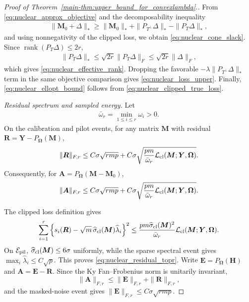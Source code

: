 \documentclass[numsec,webpdf,modern,large,namedate]{oup-authoring-template}
\theoremstyle{plain}
\theoremstyle{remark}
\newcommand{\M}{\bm{M}}
\newcommand{\bH}{\bm{H}}
\newcommand{\Y}{\bm{Y}}
\newcommand{\bOmega}{\bm{\Omega}}
\newif\ifmarkchanges
\newenvironment{revision}{\begingroup\ifmarkchanges\color{red}\fi}{\endgroup}
\begin{document}
\begin{revision}
\begin{proof}[Proof of Theorem~\ref{main-thm:upper_bound_for_convexlambda}.]
From \eqref{eq:nuclear_approx_objective} and the decomposability inequality
\begin{align*}
 \|\M_0+\Delta\|_*
 \ge
 \|\M_0\|_*
 +
 \|P_{T^\perp}\Delta\|_*
 -
 \|P_T\Delta\|_*,
\end{align*}
and using nonnegativity of the clipped loss, we obtain
\eqref{eq:nuclear_cone_slack}.  Since
$\operatorname{rank}(P_T\Delta)\le2r$,
\begin{align*}
 \|P_T\Delta\|_*
 \le
 \sqrt{2r}\|P_T\Delta\|_F
 \le
 \sqrt{2r}\|\Delta\|_F,
\end{align*}
which gives \eqref{eq:nuclear_effective_rank}.  Dropping the favorable
$-\lambda\|P_{T^\perp}\Delta\|_*$ term in the same objective
comparison gives \eqref{eq:nuclear_loss_upper}.  Finally,
\eqref{eq:nuclear_ellopt_bound} follows from
\eqref{eq:nuclear_clipped_true_loss}.

\textit{Residual spectrum and sampled energy.} Let
\begin{align}
\label{eq:nuclear_omega_r}
 \bar\omega_r
 =
 \min_{1\le i\le r}\omega_i
 >0.
\end{align}
On the calibration and pilot events, for any matrix $\M$ with residual
$\bm R=\Y-P_{\bOmega}(\M)$,
\begin{align}
 \|\bm R\|_{F,r}
 \le
 C\sigma\sqrt{rmp}
 +
 C\sigma
 \sqrt{
 \frac{pm}{\bar\omega_r}
 \mathcal L_{\rm cl}(\M;\Y,\bOmega)
 }.
 \label{eq:nuclear_residual_topr}
\end{align}
Consequently, for
$\bm A=P_{\bOmega}(\M-\M_0)$,
\begin{align}
 \|\bm A\|_{F,r}
 \le
 C\sigma\sqrt{rmp}
 +
 C\sigma
 \sqrt{
 \frac{pm}{\bar\omega_r}
 \mathcal L_{\rm cl}(\M;\Y,\bOmega)
 }.
 \label{eq:nuclear_sampled_topr}
\end{align}

The clipped loss definition gives
\begin{align*}
 \sum_{i=1}^r
 \left\{
 s_i(\bm R)
 -
 \sqrt m\,\widehat\sigma_{\rm cl}(\M)
 \widehat\lambda_i
 \right\}^2
 \le
 \frac{
 pm\widehat\sigma_{\rm cl}(\M)^2
 }{\bar\omega_r}
 \mathcal L_{\rm cl}(\M;\Y,\bOmega).
\end{align*}
On $\mathcal E_{\rm pil}$,
$\widehat\sigma_{\rm cl}(\M)\le6\sigma$ uniformly, while the sparse spectral
event gives $\max_i\widehat\lambda_i\le C\sqrt p$.  This proves
\eqref{eq:nuclear_residual_topr}.  Write
$\bm E=P_{\bOmega}(\bH)$ and
$\bm A=\bm E-\bm R$.  Since the Ky Fan--Frobenius norm is unitarily
invariant,
\[
 \|\bm A\|_{F,r}
 \le
 \|\bm E\|_{F,r}+\|\bm R\|_{F,r},
\]
and the masked-noise event gives
$\|\bm E\|_{F,r}\le C\sigma\sqrt{rmp}$.


\end{proof}
\end{revision}
\end{document}
